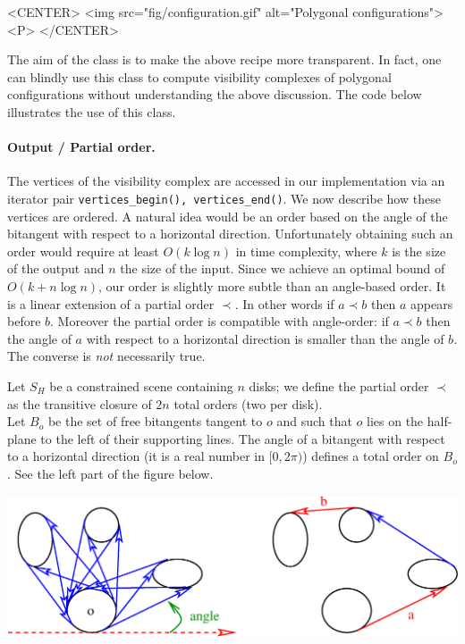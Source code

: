 \begin{ccHtmlOnly}
    <CENTER>
        <img src="fig/configuration.gif" alt="Polygonal configurations"><P>
    </CENTER>
\end{ccHtmlOnly}

The aim of the  class is to make the above recipe
more transparent. In fact, one can blindly use this class to compute visibility
complexes of polygonal configurations without understanding the above
discussion. The code below illustrates the use of this class.


\paragraph{Output / Partial order. } 
\label{sectionVComplexInputOutput}
The vertices of the visibility complex are
accessed in our implementation via an iterator pair \texttt{vertices\_begin(),
vertices\_end()}. We now describe how these vertices are ordered. A natural idea
would be an order based on the angle of the bitangent with respect to a
horizontal direction. Unfortunately obtaining such an order would require at
least $O(k \log n)$ in time complexity, where $k$ is the size of the output and
$n$ the size of the input. Since we achieve an optimal bound of $O(k + n\log
n)$, our order is slightly more subtle than an angle-based order. It is a linear
extension of a partial order $\prec$. In other words if $a \prec b$  then $a$
appears before $b$. Moreover the partial order is compatible with angle-order:
if $a \prec b$ then the angle of $a$ with respect to a horizontal direction is
smaller than the angle of $b$. The converse is \emph{not} necessarily true.

Let $S_H$ be a constrained scene containing $n$ disks; we define the partial
order $\prec$ as the transitive closure of $2n$ total orders (two per disk). \\
Let $B_o$ be the set of free bitangents tangent to $o$ and such that $o$ lies
on the half-plane to the left of their supporting lines. The angle of a
bitangent with respect to a horizontal direction (it is a real number in
$[0,2\pi)$) defines a total order on $B_o$. See the left part of the figure below.

\begin{ccTexOnly}
    \begin{center}
	\includegraphics[width=\textwidth]{fig/order.eps}%
    \end{center}
\end{ccTexOnly}

